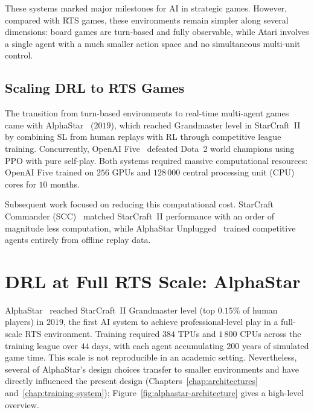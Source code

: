 These systems marked major milestones for AI in strategic games. However, compared with RTS games, these environments remain simpler along several dimensions: board games are turn-based and fully observable, while Atari involves a single agent with a much smaller action space and no simultaneous multi-unit control.

\subsection{Scaling DRL to RTS Games}

The transition from turn-based environments to real-time multi-agent games came with AlphaStar~\cite{vinyalsGrandmasterLevelStarCraft2019} ($2019$), which reached Grandmaster level in StarCraft~II by combining SL from human replays with RL through competitive league training. Concurrently, OpenAI Five~\cite{openaiDota2Large2019} defeated Dota~2 world champions using PPO with pure self-play. Both systems required massive computational resources: OpenAI Five trained on $256$ GPUs and $128\,000$ central processing unit (CPU) cores for $10$ months.

Subsequent work focused on reducing this computational cost. StarCraft Commander (SCC)~\cite{wangSCCEfficientDeep2020} matched StarCraft~II performance with an order of magnitude less computation, while AlphaStar Unplugged~\cite{mathieuAlphaStarUnpluggedLargeScale2023} trained competitive agents entirely from offline replay data.

\section{DRL at Full RTS Scale: AlphaStar}
\label{sec:alphastar}

AlphaStar~\cite{vinyalsGrandmasterLevelStarCraft2019} reached StarCraft~II Grandmaster level (top $0.15$\% of human players) in $2019$, the first AI system to achieve professional-level play in a full-scale RTS environment. Training required $384$ TPUs and $1\,800$ CPUs across the training league over $44$ days, with each agent accumulating $200$ years of simulated game time. This scale is not reproducible in an academic setting. Nevertheless, several of AlphaStar's design choices transfer to smaller environments and have directly influenced the present design (Chapters~\ref{chap:architectures} and~\ref{chap:training-system}); Figure~\ref{fig:alphastar-architecture} gives a high-level overview.

